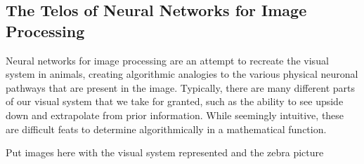 \subsection{The Telos of Neural Networks for Image Processing}

Neural networks for image processing are an attempt to recreate the visual system in animals, creating algorithmic analogies to the various physical neuronal pathways that are present in the image. Typically, there are many different parts of our visual system that we take for granted, such as the ability to see upside down and extrapolate from prior information. While seemingly intuitive, these are difficult feats to determine algorithmically in a mathematical function. 

\begin{center}
    \huge{Put images here with the visual system represented and the zebra picture}
\end{center}